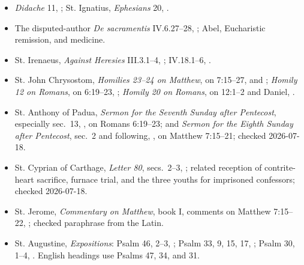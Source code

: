 \begin{deepstudy}
{\begin{itemize}[itemsep=0em,topsep=0.15em,parsep=0pt]
\item \emph{Didache} 11, ; St. Ignatius, \emph{Ephesians} 20, .
\item The disputed-author \emph{De sacramentis} IV.6.27--28, ; Abel, Eucharistic remission, and medicine.
\item St. Irenaeus, \emph{Against Heresies} III.3.1--4, ; IV.18.1--6, .
\item St. John Chrysostom, \emph{Homilies 23--24 on Matthew}, on 7:15--27,  and ; \emph{Homily 12 on Romans}, on 6:19--23, ; \emph{Homily 20 on Romans}, on 12:1--2 and Daniel, .
\item St. Anthony of Padua, \emph{Sermon for the Seventh Sunday after Pentecost}, especially sec.~13, , on Romans 6:19--23; and \emph{Sermon for the Eighth Sunday after Pentecost}, sec.~2 and following, , on Matthew 7:15--21; checked 2026-07-18.
\item St. Cyprian of Carthage, \emph{Letter 80}, secs.~2--3, ; related reception of contrite-heart sacrifice, furnace trial, and the three youths for imprisoned confessors; checked 2026-07-18.
\item St. Jerome, \emph{Commentary on Matthew}, book I, comments on Matthew 7:15--22, ; checked paraphrase from the Latin.
\item St. Augustine, \emph{Expositions}: Psalm 46, 2--3, ; Psalm 33, 9, 15, 17, ; Psalm 30, 1--4, . English headings use Psalms 47, 34, and 31.

\end{itemize}}
\end{deepstudy}
